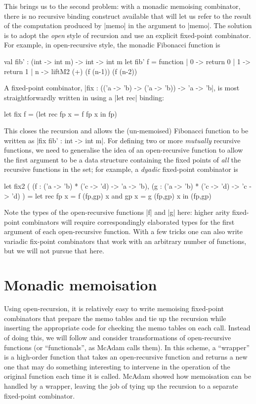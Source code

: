 This brings us to the second problem: with a monadic memoising combinator,
there is no recursive binding construct available that will let us refer to the
result of the computation produced by |memo| in the argument to |memo|.
The solution is to adopt the \emph{open} style of recursion and
use an explicit fixed-point combinator. For example, in open-recursive
style, the monadic Fibonacci function is
\begin{badocaml}
	val fib' : (int -> int m) -> int -> int m
	let fib' f = function | 0 -> return 0 | 1 -> return 1 
	                       | n -> liftM2 (+) (f (n-1)) (f (n-2))
\end{badocaml}
A fixed-point combinator, |fix : (('a -> 'b) -> ('a -> 'b)) -> 'a -> 'b|,
is most straightforwardly written in \OCaml
using a |let rec| binding:
\begin{ocaml}
  let fix f = (let rec fp x = f fp x in fp)
\end{ocaml}
This closes the recursion and allows the (un-memoised) Fibonacci function to be
written as |fix fib' : int -> int m|.
For defining two or more \emph{mutually} recursive functions, we need to generalise the
idea of an open-recursive function to allow the first argument to be a data structure
containing the fixed points of \emph{all} the recursive functions in the set; for example,
a \emph{dyadic} fixed-point combinator is
\begin{ocaml}
  let fix2 ( (f : ('a -> 'b) * ('c -> 'd) -> 'a -> 'b),
	           (g : ('a -> 'b) * ('c -> 'd) -> 'c -> 'd) ) =
	  let rec fp x = f (fp,gp) x
	  and     gp x = g (fp,gp) x
	  in (fp,gp)
\end{ocaml}
Note the types of the open-recursive functions |f| and |g| here: higher
arity fixed-point combinators will require correspondingly elaborated
types for the first argument of each open-recursive function.
With a few tricks \cite{Kiselyov2003-fixedpoint} one can also write variadic 
fix-point combinators that work with an arbitrary number of functions, but
we will not pursue that here. 

\section{Monadic memoisation}
\label{memoisation}

Using open-recursion, it is relatively easy to write memoising fixed-point
combinators that prepare the memo tables and tie up the recursion while
inserting the appropriate code for checking the memo tables on each call. 
Instead of doing this, we will follow
\citet{McAdam1997} and consider transformations of open-recursive functions
(or ``functionals'', as McAdam calls them). In this scheme,
a ``wrapper'' is a high-order function that takes an open-recursive
function and returns a new one that may do something interesting to intervene in the
operation of the original function each time it is called. McAdam showed how
memoisation can be handled by a wrapper, leaving the job of tying up the recursion
to a separate fixed-point combinator.

